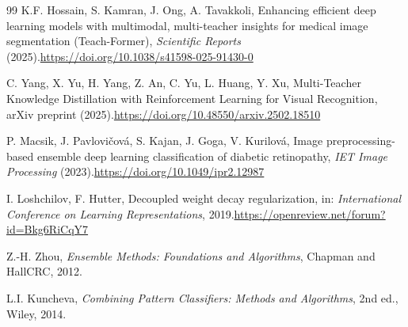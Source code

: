 \documentclass[a4paper,fleqn]{cas-dc}
\begin{document}
\begin{thebibliography}{99}
K.F. Hossain, S. Kamran, J. Ong, A. Tavakkoli,
Enhancing efficient deep learning models with multimodal, multi-teacher insights for medical image segmentation (Teach-Former),
\textit{Scientific Reports} (2025).\newline\url{https://doi.org/10.1038/s41598-025-91430-0}

C. Yang, X. Yu, H. Yang, Z. An, C. Yu, L. Huang, Y. Xu,
Multi-Teacher Knowledge Distillation with Reinforcement Learning for Visual Recognition,
arXiv preprint (2025).\newline\url{https://doi.org/10.48550/arxiv.2502.18510}

P. Macsik, J. Pavlovi\v{c}ov\'a, S. Kajan, J. Goga, V. Kurilov\'a,
Image preprocessing-based ensemble deep learning classification of diabetic retinopathy,
\textit{IET Image Processing} (2023).\newline\url{https://doi.org/10.1049/ipr2.12987}

I. Loshchilov, F. Hutter,
Decoupled weight decay regularization,
in: \textit{International Conference on Learning Representations}, 2019.\newline\url{https://openreview.net/forum?id=Bkg6RiCqY7}

Z.-H. Zhou,
\textit{Ensemble Methods: Foundations and Algorithms},
Chapman and Hall\/CRC, 2012.

L.I. Kuncheva,
\textit{Combining Pattern Classifiers: Methods and Algorithms}, 2nd ed.,
Wiley, 2014.

\end{thebibliography}
\end{document}

